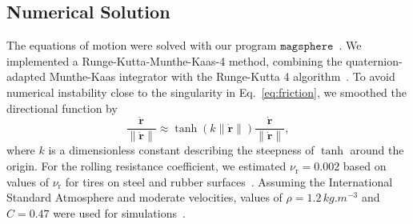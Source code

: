 \subsection{Numerical Solution}
The equations of motion were solved with our program $\mathtt{magsphere}$~\cite{code}. We implemented a Runge-Kutta-Munthe-Kaas-4 method, combining the quaternion-adapted Munthe-Kaas integrator with the Runge-Kutta 4 algorithm~\cite{Butcher1996, MuntheKaas1998}. To avoid numerical instability close to the singularity in Eq.~\ref{eq:friction}, we smoothed the directional function by
\begin{equation}
    \label{eq:smoothfriction}
        \frac{\dot{\bm{r}}}{\|\dot{\bm{r}}\|} \approx \tanh(k \| \dot{\bm{r}}\|) \frac{\dot{\bm{r}}}{\|\dot{\bm{r}}\|},
\end{equation}
where $k$ is a dimensionless constant describing the steepness of $\tanh$ around the origin. For the rolling resistance coefficient, we estimated $\nu_\text{r}=0.002$ based on values of $\nu_\text{r}$ for tires on steel and rubber surfaces~\cite{Guba2023}.
Assuming the International Standard Atmosphere and moderate velocities, values of $\rho = 1.2 \, \unit{kg.m^{-3}}$ and $C=0.47$ were used for simulations~\cite{iso2533, Baker1983}.